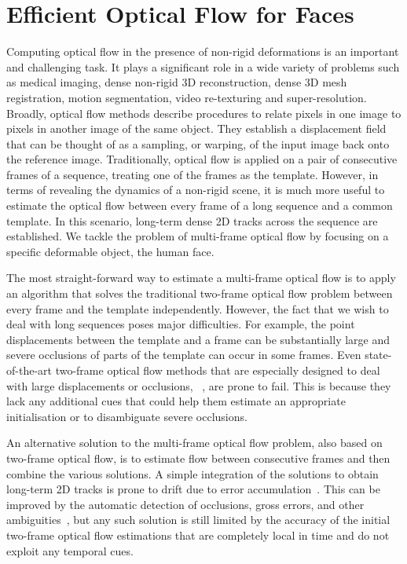 \section{Efficient Optical Flow for Faces}\label{sec:face_flow_intro}
Computing optical flow in the presence of non-rigid deformations
is an important and challenging task. It plays a significant role in a wide variety of
problems such as medical imaging, dense non-rigid 3D reconstruction,
dense 3D mesh registration, motion segmentation, video re-texturing and super-resolution.
Broadly, optical flow methods describe procedures to relate pixels in
one image to pixels in another image of the same object. They establish a
displacement field that can be thought of as a sampling, or warping, of the input
image back onto the reference image. Traditionally, optical flow is applied on a pair
of consecutive frames of a sequence, treating one of the frames as the template.
However, in terms of revealing the dynamics of a non-rigid scene, it is much more
useful to estimate the optical flow between every frame of a long sequence and a
common template. In this scenario, long-term dense 2D tracks across the sequence
are established. We tackle the problem of multi-frame optical flow by focusing on a
specific deformable object, the human face.

The most straight-forward way to estimate a multi-frame optical flow is to apply an
algorithm that solves the traditional two-frame optical flow problem between every
frame and the template independently.
However, the fact that we wish to deal with long sequences poses major difficulties.
For example, the point displacements between the template and a frame can be substantially
large and severe occlusions of parts of the template can occur in some frames. Even
state-of-the-art two-frame optical flow methods that are especially designed to deal
with large displacements or occlusions, \eg~\cite{brox2011large,revaud2015epicflow},
are  prone to fail. This is because they lack any additional cues that could help
them estimate an appropriate initialisation or to disambiguate severe occlusions.

An alternative solution to the multi-frame optical flow problem, also based on
two-frame optical flow, is to estimate flow between consecutive frames and then
combine the various solutions. A simple integration of the solutions to obtain long-term
2D tracks is prone to drift due to error accumulation~\cite{cosker2011facs,brox2011large}.
This can be improved by the automatic detection of occlusions, gross errors,
and other ambiguities~\cite{sand2008particle,sundaram2010dense,%
rubinstein2012towards,ricco2012simultaneous,papamakarios2011generalised},
but any such solution is still limited by the accuracy of the initial two-frame
optical  flow estimations that are completely local in time and do not exploit
any temporal cues.

